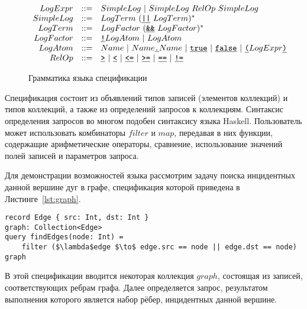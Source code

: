 \documentclass[14pt]{matmex-diploma-custom}
\begin{document}
\begin{figure}[H]
\begin{minipage}{\linewidth}
\[\begin{array}{rcl}
LogExpr        & ::= & SimpleLog ~|~ SimpleLog ~RelOp~ SimpleLog \\

SimpleLog  & ::= &  LogTerm~ (\texttt{\underline{||}} ~LogTerm)^* \\

LogTerm      & ::= &  LogFactor~ (\texttt{\underline{\&\&}} ~LogFactor)^* \\

LogFactor    & ::= &  \texttt{\underline{!}} LogAtom ~|~ LogAtom \\

LogAtom           & ::= &  Name ~|~ Name\texttt{\underline{.}}Name ~|~ \texttt{\underline{true}} ~|~ \texttt{\underline{false}}  ~|~ \texttt{\underline{(}} LogExpr \texttt{\underline{)}} \\

RelOp        & ::= &  \texttt{\underline{>}} ~|~ \texttt{\underline{<}} ~|~ \texttt{\underline{<=}} ~|~ \texttt{\underline{>=}} ~|~ \texttt{\underline{==}} ~|~ \texttt{\underline{!=}} \\

\end{array}
\]

\end{minipage}
\caption{Грамматика языка спецификации}
\end{figure}

Спецификация состоит из объявлений типов записей (элементов коллекций) и типов коллекций, а также из определений запросов к коллекциям. Синтаксис определения запросов во многом подобен синтаксису языка Haskell. Пользователь может использовать комбинаторы $filter$ и $map$, передавая в них функции, содержащие арифметические операторы, сравнение, использование значений полей записей и параметров запроса.

Для демонстрации возможностей языка рассмотрим задачу поиска инцидентных данной вершине дуг в графе, спецификация которой приведена в Листинге~\ref{lst:graph}.

\begin{lstlisting}[caption={Поиск инцидентных данной вершине дуг в графе}, captionpos=t, label={lst:graph}, mathescape=true, frame=none]
record Edge { src: Int, dst: Int }
graph: Collection<Edge>
query findEdges(node: Int) =
    filter ($\lambda$edge $\to$ edge.src == node || edge.dst == node) graph
\end{lstlisting}

В этой спецификации вводится некоторая коллекция $graph$, состоящая из записей, соответствующих ребрам графа. Далее определяется запрос, результатом выполнения которого является набор рёбер, инцидентных данной вершине.
\end{document}
